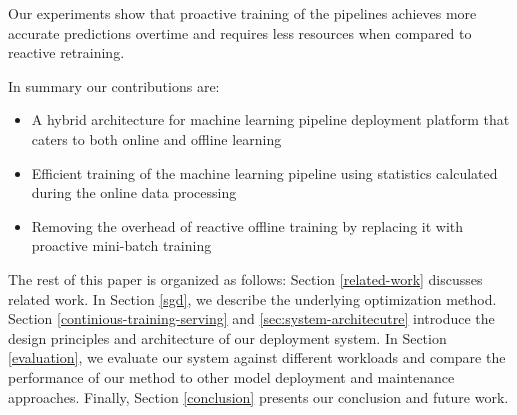 \documentclass[10pt,conference,letterpaper]{IEEEtran}
\begin{document}
Our experiments show that proactive training of the pipelines achieves more accurate predictions overtime and requires less resources when compared to reactive retraining.

In summary our contributions are:
\begin{itemize}
\item A hybrid architecture for machine learning pipeline deployment platform that caters to both online and offline learning
\item Efficient training of the machine learning pipeline using statistics calculated during the online data processing
\item Removing the overhead of reactive offline training by replacing it with proactive mini-batch training
\end{itemize}

The rest of this paper is organized as follows:
Section \ref {related-work} discusses related work.
In Section \ref{sgd}, we describe the underlying optimization method.
Section \ref{continious-training-serving} and \ref{sec:system-architecutre} introduce the design principles and architecture of our deployment system.
In Section \ref{evaluation}, we evaluate our system against different workloads and compare the performance of our method to other model deployment and maintenance approaches. 
Finally, Section \ref{conclusion} presents our conclusion and future work.
%
\end{document}

